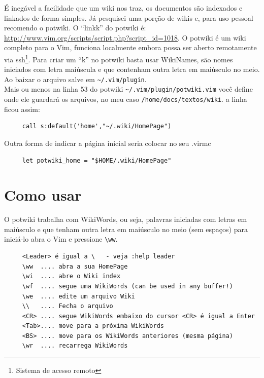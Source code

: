 \documentclass[10pt,a4paper,openany]{book}
\begin{document}
É inegável a facilidade que um wiki nos traz, os documentos são
indexados e linkados de forma simples. Já pesquisei uma porção de
wikis e, para uso pessoal recomendo o potwiki.  O ``linkk'' do potwiki é:
\url{http://www.vim.org/scripts/script.php?script_id=1018}.
O potwiki é um wiki completo para o Vim, funciona localmente embora
possa ser aberto remotamente via ssh\footnote{Sistema de acesso remoto}.
Para criar um ``k'' no potwiki basta usar WikiNames, são nomes
iniciados com letra maiúscula e que contenham outra letra em maiúsculo
no meio. \\


Ao baixar o arquivo salve em \verb|~/.vim/plugin|. \\



Mais ou menos na linha 53 do potwiki \verb|~/.vim/plugin/potwiki.vim| você
define onde ele guardará os arquivos, no meu caso
\verb|/home/docs/textos/wiki|. a linha ficou assim:

\begin{verbatim}
     call s:default('home',"~/.wiki/HomePage")
\end{verbatim}

Outra forma de indicar a página inicial seria colocar no seu .virmc

\begin{verbatim}
     let potwiki_home = "$HOME/.wiki/HomePage"
\end{verbatim}

\section{Como usar}
\label{Como usar}

O potwiki trabalha com WikiWords, ou seja, palavras iniciadas com
letras em maiúsculo e que tenham outra letra em maiúsculo no meio (sem
espaços) para iniciá-lo abra o Vim e pressione \verb|\ww|.

\begin{verbatim}
     <Leader> é igual a \   - veja :help leader
     \ww  .... abra a sua HomePage
     \wi  .... abre o Wiki index
     \wf  .... segue uma WikiWords (can be used in any buffer!)
     \we  .... edite um arquivo Wiki
     \\   .... Fecha o arquivo
     <CR> .... segue WikiWords embaixo do cursor <CR> é igual a Enter
     <Tab>.... move para a próxima WikiWords
     <BS> .... move para os WikiWords anteriores (mesma página)
     \wr  .... recarrega WikiWords
\end{verbatim}
\end{document}
